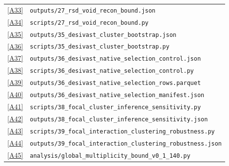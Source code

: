 \documentclass[twocolumn,linenumbers]{aastex702}
\newcommand{\repoBase}{https://github.com/Hubify-Projects/bigbounce/blob/main}
\begin{document}
\begin{table}[p]
{\begin{ruledtabular}
\begin{tabular}{lp{}}
\href{\repoBase/pipelines/p5\_desi\_chirality/outputs/27\_rsd\_void\_recon\_bound.json}{[A33]} & \texttt{outputs/27\_rsd\_void\_recon\_bound.json} \\
\href{\repoBase/pipelines/p5\_desi\_chirality/scripts/27\_rsd\_void\_recon\_bound.py}{[A34]} & \texttt{scripts/27\_rsd\_void\_recon\_bound.py} \\
\href{\repoBase/pipelines/p5\_desi\_chirality/outputs/35\_desivast\_cluster\_bootstrap.json}{[A35]} & \texttt{outputs/35\_desivast\_cluster\_bootstrap.json} \\
\href{\repoBase/pipelines/p5\_desi\_chirality/scripts/35\_desivast\_cluster\_bootstrap.py}{[A36]} & \texttt{scripts/35\_desivast\_cluster\_bootstrap.py} \\
\href{\repoBase/pipelines/p5\_desi\_chirality/outputs/36\_desivast\_native\_selection\_control.json}{[A37]} & \texttt{outputs/36\_desivast\_native\_selection\_control.json} \\
\href{\repoBase/pipelines/p5\_desi\_chirality/scripts/36\_desivast\_native\_selection\_control.py}{[A38]} & \texttt{scripts/36\_desivast\_native\_selection\_control.py} \\
\href{\repoBase/pipelines/p5\_desi\_chirality/outputs/36\_desivast\_native\_selection\_rows.parquet}{[A39]} & \texttt{outputs/36\_desivast\_native\_selection\_rows.parquet} \\
\href{\repoBase/pipelines/p5\_desi\_chirality/outputs/36\_desivast\_native\_selection\_manifest.json}{[A40]} & \texttt{outputs/36\_desivast\_native\_selection\_manifest.json} \\
\href{\repoBase/pipelines/p5\_desi\_chirality/scripts/38\_focal\_cluster\_inference\_sensitivity.py}{[A41]} & \texttt{scripts/38\_focal\_cluster\_inference\_sensitivity.py} \\
\href{\repoBase/pipelines/p5\_desi\_chirality/outputs/38\_focal\_cluster\_inference\_sensitivity.json}{[A42]} & \texttt{outputs/38\_focal\_cluster\_inference\_sensitivity.json} \\
\href{\repoBase/pipelines/p5\_desi\_chirality/scripts/39\_focal\_interaction\_clustering\_robustness.py}{[A43]} & \texttt{scripts/39\_focal\_interaction\_clustering\_robustness.py} \\
\href{\repoBase/pipelines/p5\_desi\_chirality/outputs/39\_focal\_interaction\_clustering\_robustness.json}{[A44]} & \texttt{outputs/39\_focal\_interaction\_clustering\_robustness.json} \\
\href{\repoBase/pipelines/p5\_desi\_chirality/analysis/global\_multiplicity\_bound\_v0\_1\_140.py}{[A45]} & \texttt{analysis/global\_multiplicity\_bound\_v0\_1\_140.py} \\

\end{tabular}
\end{ruledtabular}}
\end{table}
\end{document}
